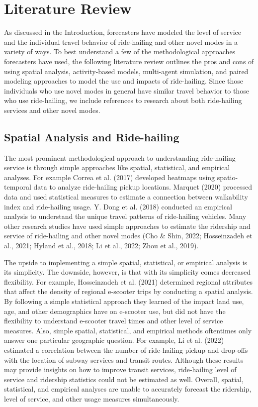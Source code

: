 \documentclass[simple, masters, twoside]{byuthesis}
\begin{document}
\hypertarget{lit}{%
\chapter{Literature Review}\label{lit}}

As discussed in the Introduction, forecasters have modeled the level of service and the individual travel behavior of ride-hailing and other novel modes in a variety of ways. To best understand a few of the methodological approaches forecasters have used, the following literature review outlines the pros and cons of using spatial analysis, activity-based models, multi-agent simulation, and paired modeling approaches to model the use and impacts of ride-hailing. Since those individuals who use novel modes in general have similar travel behavior to those who use ride-hailing, we include references to research about both ride-hailing services and other novel modes.

\hypertarget{lit-simp}{%
\section{Spatial Analysis and Ride-hailing}\label{lit-simp}}

The most prominent methodological approach to understanding ride-hailing service is through simple approaches like spatial, statistical, and empirical analyses. For example Correa et al. (2017) developed heatmaps using spatio-temporal data to analyze ride-hailing pickup locations. Marquet (2020) processed data and used statistical measures to estimate a connection between walkability index and ride-hailing usage. Y. Dong et al. (2018) conducted an empirical analysis to understand the unique travel patterns of ride-hailing vehicles. Many other research studies have used simple approaches to estimate the ridership and service of ride-hailing and other novel modes (Cho \& Shin, 2022; Hosseinzadeh et al., 2021; Hyland et al., 2018; Li et al., 2022; Zhou et al., 2019).

The upside to implementing a simple spatial, statistical, or empirical analysis is its simplicity. The downside, however, is that with its simplicity comes decreased flexibility. For example, Hosseinzadeh et al. (2021) determined regional attributes that affect the density of regional e-scooter trips by conducting a spatial analysis. By following a simple statistical approach they learned of the impact land use, age, and other demographics have on e-scooter use, but did not have the flexibility to understand e-scooter travel times and other level of service measures. Also, simple spatial, statistical, and empirical methods oftentimes only answer one particular geographic question. For example, Li et al. (2022) estimated a correlation between the number of ride-hailing pickup and drop-offs with the location of subway services and transit routes. Although these results may provide insights on how to improve transit services, ride-hailing level of service and ridership statistics could not be estimated as well. Overall, spatial, statistical, and empirical analyses are unable to accurately forecast the ridership, level of service, and other usage measures simultaneously.
\end{document}
